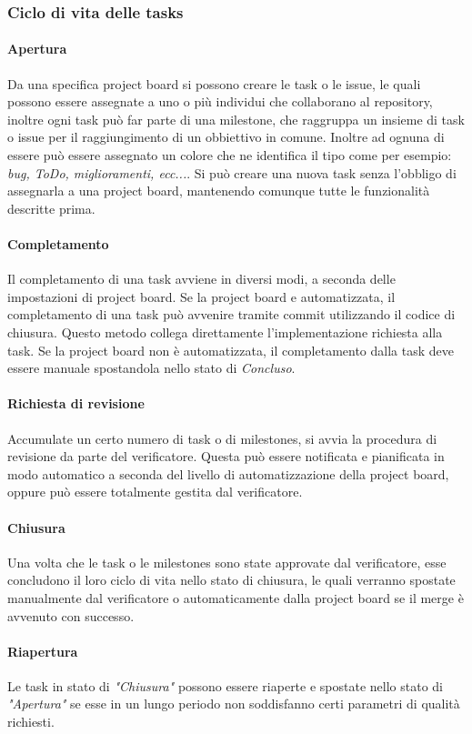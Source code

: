 \subsubsection{Ciclo di vita delle tasks}

	\paragraph{Apertura}
	Da una specifica project board si possono creare le task o le issue\glossario, le quali possono essere assegnate a uno o più individui che collaborano al repository, inoltre ogni task
	può far parte di una milestone\glossario, che raggruppa un insieme di task o issue per il raggiungimento di un obbiettivo in comune. 
	Inoltre ad ognuna di essere può essere assegnato un colore che ne identifica il tipo come per esempio: \textit{bug, ToDo, miglioramenti, ecc...}. 
	Si può creare una nuova task senza l'obbligo di assegnarla a una project board, mantenendo comunque tutte le funzionalità descritte prima. 

	\paragraph{Completamento}
	Il completamento di una task avviene in diversi modi, a seconda delle impostazioni di project board. 
	Se la project board e automatizzata, il completamento di una task può avvenire tramite commit utilizzando il codice di chiusura. 
	Questo metodo collega direttamente l'implementazione richiesta alla task. 
	Se la project board non è automatizzata, il completamento dalla task deve essere manuale spostandola nello stato di \textit{Concluso}. 
	
	\paragraph{Richiesta di revisione}
	Accumulate un certo numero di task o di milestones, si avvia la procedura di revisione da parte del verificatore. Questa può essere notificata e pianificata in modo automatico
	a seconda del livello di automatizzazione della project board, oppure può essere totalmente gestita dal verificatore. 
	
	\paragraph{Chiusura}
	Una volta che le task o le milestones sono state approvate dal verificatore, esse concludono il loro ciclo di vita nello stato di chiusura, le quali verranno spostate manualmente dal 
	verificatore o automaticamente dalla project board se il merge è avvenuto con successo. 
	
	\paragraph{Riapertura}
	Le task in stato di \textit{"Chiusura"} possono essere riaperte e spostate nello stato di \textit{"Apertura"} se esse in un lungo periodo non soddisfanno certi parametri di qualità
	richiesti. 
	
